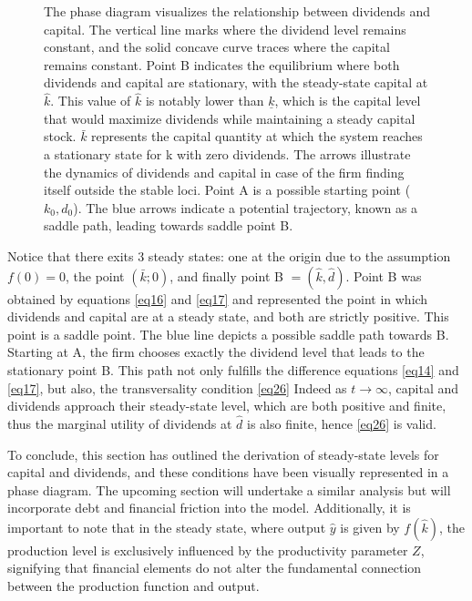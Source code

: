 \documentclass[12pt]{report}
\begin{document}
\begin{figure}
    \caption{The phase diagram visualizes the relationship between dividends and capital. The vertical line marks
    where the dividend level remains constant, and the solid concave curve traces where the capital remains constant.
    Point B indicates the equilibrium where both dividends and capital are stationary, with the steady-state capital at
    \( \hat{k} \). This value of \( \hat{k} \) is notably lower than \( \underline{k} \), which is the capital level
    that would maximize dividends while maintaining a steady capital stock. \( \bar{k} \) represents the capital
    quantity at which the system reaches a stationary state for k with zero dividends. The arrows illustrate the dynamics of dividends and capital in case of the firm finding itself outside the stable
    loci. Point A is a possible starting point (\(k_0,d_0\)). 
    The blue arrows indicate a potential trajectory, known as a saddle path, leading towards saddle point B. 
    }
    \label{fig:ph_d_nodebt}
\end{figure}
Notice that there exits 3 steady states: one at the origin due to the assumption \(f(0)=0\), the point \((\bar{k};0)\),
and finally point B \(=(\hat{k},\hat{d})\). Point B was obtained by equations \ref{eq16} and \ref{eq17} and represented the point in
which dividends and capital are at a steady state, and both are strictly positive. This point is a saddle point.
The blue line depicts a possible saddle path towards B. Starting at A, the firm chooses exactly the dividend level that
leads to the stationary point B. This path not only fulfills the difference equations \ref{eq14} and \ref{eq17}, but
also, the transversality condition \ref{eq26}
Indeed as \(t \rightarrow \infty\), capital and dividends approach their steady-state level, which are both positive and
finite, thus the marginal utility of dividends at \(\hat{d}\) is also finite, hence \ref{eq26} is valid.

To conclude, this section has outlined the derivation of steady-state levels for capital and dividends, and these
conditions have been visually represented in a phase diagram. The upcoming section will undertake a similar analysis but
will incorporate debt and financial friction into the model. Additionally, it is important to note that in the steady
state, where output \(\hat{y}\) is given by \(f(\hat{k})\), the production level is exclusively influenced by the
productivity parameter \(Z\), signifying that financial elements do not alter the fundamental connection between the
production function and output. 
\end{document}

